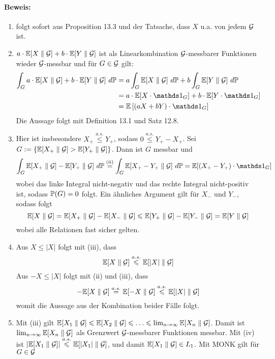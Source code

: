 \documentclass[11pt]{report}
\begin{document}
     \paragraph{Beweis:}
     \begin{enumerate}[label=(\roman*)]
         \item folgt sofort aus Proposition 13.3 und der Tatsache, dass $X$ u.a. von jedem $\mathcal{G}$ ist.
         \item $a\cdot\mathbb{E}[X\parallel\mathcal{G}]+b\cdot\mathbb{E}[Y\parallel\mathcal{G}]$ ist als Linearkombination $\mathcal{G}$-messbarer Funktionen wieder $\mathcal{G}$-messbar und für $G\in\mathcal{G}$ gilt:
         \begin{align*}
             \int_Ga\cdot\E[X\parallel\G]+b\cdot\E[Y\parallel\G]\ d\Pp&=a\int_G\E[X\parallel\G]\ d\Pp+b\int_G\E[Y\parallel\G]\ d\Pp\\
             &=a\cdot\E[X\cdot\ind{G}]+b\cdot\E[Y\cdot\ind{G}]\\
             &=\E\left[(aX+bY)\cdot\ind{G}\right]
         \end{align*}
         Die Aussage folgt mit Definition 13.1 und Satz 12.8.
         \item Hier ist insbesondere $X_+\overset{a.s.}{\leq}Y_+$, sodass $0\overset{a.s.}{\leq} Y_+-X_+$. Sei $G:=\left\{\mathbb{E}[X_+\parallel\mathcal{G}]>\mathbb{E}[Y_+\parallel\mathcal{G}]\right\}$. Dann ist $G$ messbar und 
         $$\int_G\E[X_+\parallel\G]-\E[Y_+\parallel\G]\ d\Pp\overset{\text{(ii)}}{=}\int_G\E[X_+-Y_+\parallel\G]\ d\Pp=\E[(X_+-Y_+)\cdot\ind{G}]$$
         wobei das linke Integral nicht-negativ und das rechte Integral nicht-positiv ist, sodass $\mathbb{P}(G)=0$ folgt. Ein ähnliches Argument gilt für $X_-$ und $Y_-$, sodass folgt
         $$\mathbb{E}[X\parallel\mathcal{G}]=\mathbb{E}[X_+\parallel\mathcal{G}]-\mathbb{E}[X_-\parallel\mathcal{G}]\leqslant\mathbb{E}[Y_+\parallel\mathcal{G}]-\mathbb{E}[Y_-\parallel\mathcal{G}]=\mathbb{E}[Y\parallel\mathcal{G}]$$
         wobei alle Relationen fast sicher gelten. 
         \item Aus $X\leq|X|$ folgt mit (iii), dass 
         $$\mathbb{E}[X\parallel\mathcal{G}]\overset{a.s.}{\leqslant}\mathbb{E}[|X|\parallel\mathcal{G}]$$ 
         Aus $-X\leq|X|$ folgt mit (ii) und (iii), dass 
         $$-\mathbb{E}[X\parallel\mathcal{G}]\overset{a.s.}{=}\mathbb{E}[-X\parallel\mathcal{G}]\overset{a.s.}{\leqslant}\mathbb{E}[|X|\parallel\mathcal{G}]$$
         womit die Aussage aus der Kombination beider Fälle folgt.
         \item Mit (iii) gilt $\mathbb{E}[X_1\parallel\mathcal{G}]\leqslant\mathbb{E}[X_2\parallel\mathcal{G}]\leqslant\hdots\leqslant\lim_{n\to\infty}\mathbb{E}[X_n\parallel\mathcal{G}]$. Damit ist $\lim_{n\to\infty}\mathbb{E}[X_n\parallel\mathcal{G}]$ als Grenzwert $\mathcal{G}$-messbarer Funktionen messbar. Mit (iv) ist $|\mathbb{E}[X_1\parallel\mathcal{G}]|\overset{a.s.}{\leqslant}\mathbb{E}[|X_1|\parallel\mathcal{G}]$, und damit $\mathbb{E}[X_1\parallel\mathcal{G}]\in L_1$. Mit MONK gilt für $G\in\mathcal{G}$

\end{enumerate}
\end{document}
